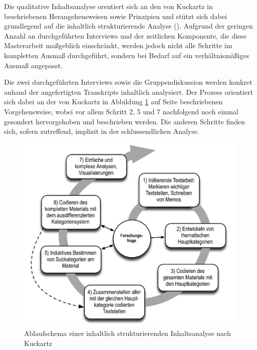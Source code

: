 \documentclass[a4paper,12pt,twoside]{scrreprt}
\begin{document}
Die qualitative Inhaltsanalyse orentiert sich an den von Kuckartz in \cite{kuckartz_qualitative_2018} beschriebenen Herangehensweisen sowie Prinzipien und stützt sich dabei grundlegend auf die inhaltlich strukturierende Analyse (\cite[97-122]{kuckartz_qualitative_2018}). Aufgrund der geringen Anzahl an durchgeführten Interviews und der zeitlichen Komponente, die diese Masterarbeit maßgeblich einschränkt, werden jedoch nicht alle Schritte im kompletten Ausmaß durchgeführt, sondern bei Bedarf auf ein verhältnismäßiges Ausmaß angepasst.

\medskip

Die zwei durchgeführten Interviews sowie die Gruppendiskussion werden konkret anhand der angefertigten Transkripts inhaltlich analysiert. Der Prozess orientiert sich dabei an der von Kuckartz in Abbildung \ref{fig:ablaufschema-inhaltlich-strukturierende-inhaltsanalyse} auf Seite \pageref{fig:ablaufschema-inhaltlich-strukturierende-inhaltsanalyse} beschriebenen Vorgehensweise, wobei vor allem Schritt 2, 5 und 7 nachfolgend noch einmal gesondert hervorgehoben und beschrieben werden. Die anderen Schritte finden sich, sofern zutreffend, implizit in der schlussendlichen Analyse.

\begin{figure}[ht]
    \centering
    \includegraphics[width=.8\linewidth]{thesis/images/Kuckartz_Ablaufschema-inhaltlich-strukturierenden-Inhaltsanalyse.png}
    \caption[blaufschema einer inhaltlich strukturierenden Inhaltsanalyse nach Kuckartz]{Ablaufschema einer inhaltlich strukturierenden Inhaltsanalyse nach Kuckartz \cite[100]{kuckartz_qualitative_2018}}
    \label{fig:ablaufschema-inhaltlich-strukturierende-inhaltsanalyse}
\end{figure}
\end{document}
